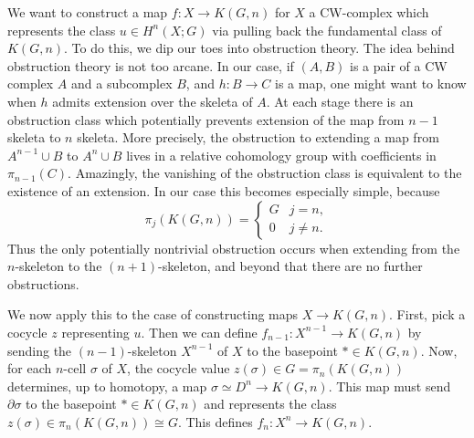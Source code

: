 We want to construct a map $f:X\to K(G,n)$ for $X$ a CW-complex which represents the class $u\in H^n(X;G)$ via pulling back the fundamental class of $K(G,n)$. To do this, we dip our toes into obstruction theory. The idea behind obstruction theory is not too arcane. In our case, if $(A,B)$ is a pair of a CW complex $A$ and a subcomplex $B$, and $h:B\to C$ is a map, one might want to know when $h$ admits extension over the skeleta of $A$. At each stage there is an obstruction class which potentially prevents extension of the map from $n-1$ skeleta to $n$ skeleta. More precisely, the obstruction to extending a map from $A^{n-1}\cup B$ to $A^n\cup B$ lives in a relative cohomology group with coefficients in $\pi_{n-1}(C)$. Amazingly, the vanishing of the obstruction class is equivalent to the existence of an extension. In our case this becomes especially simple, because
\[
\pi_j(K(G,n))=
\begin{cases}
G & j=n,\\
0 & j\neq n.
\end{cases}
\]
Thus the only potentially nontrivial obstruction occurs when extending from the $n$-skeleton to the $(n+1)$-skeleton, and beyond that there are no further obstructions. 

We now apply this to the case of constructing maps $X\to K(G,n)$. First, pick a cocycle $z$ representing $u$. Then we can define $f_{n-1}:X^{n-1}\to K(G,n)$ by sending the $(n-1)$-skeleton $X^{n-1}$ of $X$ to the basepoint $*\in K(G,n)$. Now, for each $n$-cell $\sigma$ of $X$, the cocycle value $z(\sigma)\in G=\pi_n(K(G,n))$ determines, up to homotopy, a map $\sigma\simeq D^n\to K(G,n)$. This map must send $\partial \sigma$ to the basepoint $*\in K(G,n)$ and represents the class $z(\sigma)\in \pi_n(K(G,n))\cong G$. This defines $f_n:X^n\to K(G,n)$.  

